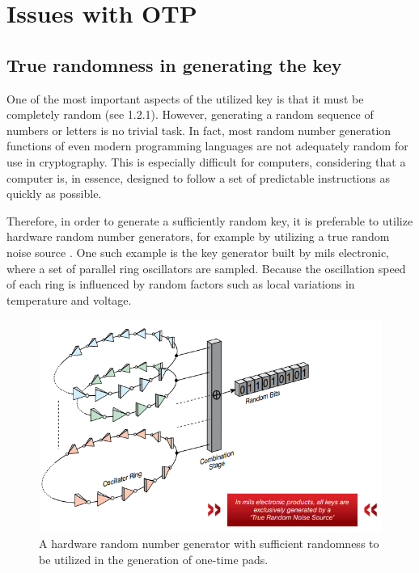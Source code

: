\documentclass[12pt]{report}
\theoremstyle{definition}
\theoremstyle{remark}
\begin{document}
\section{Issues with OTP}
\subsection{True randomness in generating the key}
One of the most important aspects of the utilized key is that it must be completely random (see 1.2.1). However, generating a random sequence of numbers or letters is no trivial task. In fact, most random number generation functions of even modern programming languages are not adequately random for use in cryptography. This is especially difficult for computers, considering that a computer is, in essence, designed to follow a set of predictable instructions as quickly as possible.

Therefore, in order to generate a sufficiently random key, it is preferable to utilize hardware random number generators, for example by utilizing a true random noise source \cite{MilsElectronic}. One such example is the key generator built by mils electronic, where a set of parallel ring oscillators are sampled. Because the oscillation speed of each ring is influenced by random factors such as local variations in temperature and voltage.

\begin{figure}[H]
\centering
\includegraphics[scale=0.75]{MilsElectronic.PNG}
\caption{A hardware random number generator with sufficient randomness to be utilized in the generation of one-time pads.}
\end{figure}
\end{document}
